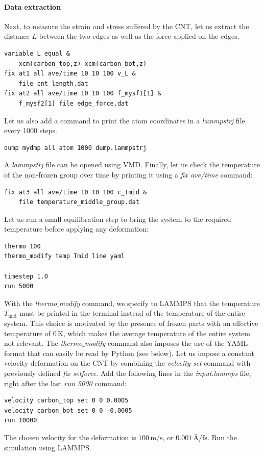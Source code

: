 \documentclass[9pt,tutorial]{livecoms}
\begin{document}
\paragraph{Data extraction}
Next, to measure the strain and stress suffered by the CNT, let us extract the distance $L$ between the two edges as well as the force applied on the edges.
{\normalsize \begin{verbatim}
variable L equal &
    xcm(carbon_top,z)-xcm(carbon_bot,z)
fix at1 all ave/time 10 10 100 v_L &
    file cnt_length.dat
fix at2 all ave/time 10 10 100 f_mysf1[1] &
    f_mysf2[1] file edge_force.dat
\end{verbatim}}
\noindent Let us also add a command to print the atom coordinates in a \textit{lammpstrj} file every 1000 steps.
{\normalsize \begin{verbatim}
dump mydmp all atom 1000 dump.lammpstrj
\end{verbatim}}
A \textit{lammpstrj} file can be opened using VMD. Finally, let us check the temperature of the non-frozen group over time by printing it using a \textit{fix ave/time} command:
{\normalsize \begin{verbatim}
fix at3 all ave/time 10 10 100 c_Tmid &
    file temperature_middle_group.dat
\end{verbatim}}
Let us run a small equilibration step to bring the system to the required temperature before applying any deformation:
{\normalsize \begin{verbatim}
thermo 100
thermo_modify temp Tmid line yaml

timestep 1.0
run 5000
\end{verbatim}}
With the \textit{thermo$\_$modify} command, we specify to LAMMPS that the temperature $T_\mathrm{mid}$ must be printed in the terminal instead of the temperature of the entire system. This choice is motivated by the presence of frozen parts with an effective temperature of 0\,K, which makes the average temperature of the entire system not relevant. The \textit{thermo$\_$modify} command also imposes the use of the YAML format that can easily be read by Python (see below). Let us impose a constant velocity deformation on the CNT by combining the \textit{velocity set} command with previously defined \textit{fix setforce}. Add the following lines in the \textit{input.lammps} file, right after the last \textit{run 5000} command:
{\normalsize \begin{verbatim}
velocity carbon_top set 0 0 0.0005
velocity carbon_bot set 0 0 -0.0005
run 10000
\end{verbatim}}
\noindent The chosen velocity for the deformation is $100\,\text{m/s}$, or $0.001\,\text{\AA{}/fs}$. Run the simulation using LAMMPS.
\end{document}

